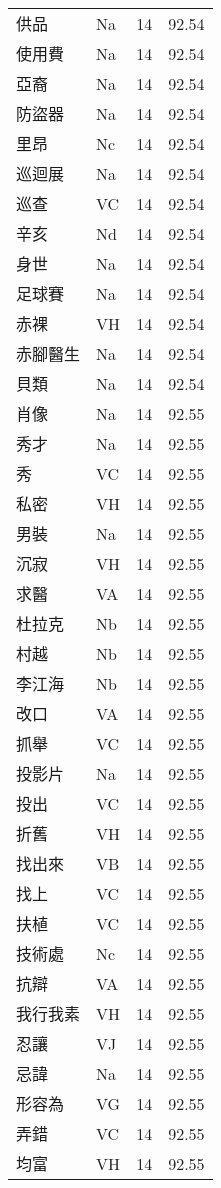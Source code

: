 \documentclass[twocolumn]{book}
\begin{document}
\begin{supertabular}{llrr}
供品 & Na & 14 &  92.54\\
使用費 & Na & 14 &  92.54\\
亞裔 & Na & 14 &  92.54\\
防盜器 & Na & 14 &  92.54\\
里昂 & Nc & 14 &  92.54\\
巡迴展 & Na & 14 &  92.54\\
巡查 & VC & 14 &  92.54\\
辛亥 & Nd & 14 &  92.54\\
身世 & Na & 14 &  92.54\\
足球賽 & Na & 14 &  92.54\\
赤裸 & VH & 14 &  92.54\\
赤腳醫生 & Na & 14 &  92.54\\
貝類 & Na & 14 &  92.54\\
肖像 & Na & 14 &  92.55\\
秀才 & Na & 14 &  92.55\\
秀 & VC & 14 &  92.55\\
私密 & VH & 14 &  92.55\\
男裝 & Na & 14 &  92.55\\
沉寂 & VH & 14 &  92.55\\
求醫 & VA & 14 &  92.55\\
杜拉克 & Nb & 14 &  92.55\\
村越 & Nb & 14 &  92.55\\
李江海 & Nb & 14 &  92.55\\
改口 & VA & 14 &  92.55\\
抓舉 & VC & 14 &  92.55\\
投影片 & Na & 14 &  92.55\\
投出 & VC & 14 &  92.55\\
折舊 & VH & 14 &  92.55\\
找出來 & VB & 14 &  92.55\\
找上 & VC & 14 &  92.55\\
扶植 & VC & 14 &  92.55\\
技術處 & Nc & 14 &  92.55\\
抗辯 & VA & 14 &  92.55\\
我行我素 & VH & 14 &  92.55\\
忍讓 & VJ & 14 &  92.55\\
忌諱 & Na & 14 &  92.55\\
形容為 & VG & 14 &  92.55\\
弄錯 & VC & 14 &  92.55\\
均富 & VH & 14 &  92.55\\

\end{supertabular}
\end{document}
